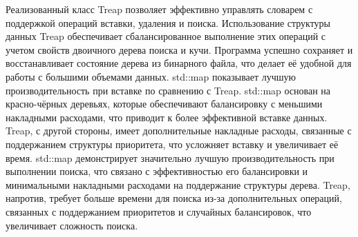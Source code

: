 \documentclass[12pt]{article}
\begin{document}
Реализованный класс Treap позволяет эффективно управлять словарем с поддержкой операций вставки, удаления и поиска. Использование структуры данных Treap обеспечивает сбалансированное выполнение этих операций с учетом свойств двоичного дерева поиска и кучи. Программа успешно сохраняет и восстанавливает состояние дерева из бинарного файла, что делает её удобной для работы с большими объемами данных.
std::map показывает лучшую производительность при вставке по сравнению с Treap. std::map основан на красно-чёрных деревьях, которые обеспечивают балансировку с меньшими накладными расходами, что приводит к более эффективной вставке данных.
Treap, с другой стороны, имеет дополнительные накладные расходы, связанные с поддержанием структуры приоритета, что усложняет вставку и увеличивает её время.
std::map демонстрирует значительно лучшую производительность при выполнении поиска, что связано с эффективностью его балансировки и минимальными накладными расходами на поддержание структуры дерева.
Treap, напротив, требует больше времени для поиска из-за дополнительных операций, связанных с поддержанием приоритетов и случайных балансировок, что увеличивает сложность поиска.
\end{document}
